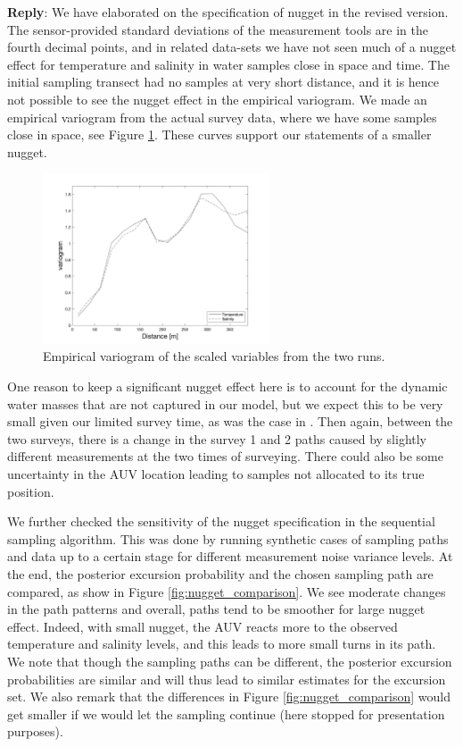 \documentclass[a4paper]{article}
\def\reply{\textbf{Reply}}
\begin{document}
\vspace{5mm}
\reply: We have elaborated on the specification of nugget in the revised version. The sensor-provided standard deviations of the measurement tools are in the fourth decimal points, and in related data-sets we have not seen much of a nugget effect for temperature and salinity in water samples close in space and time. The initial sampling transect had no samples at very short distance, and it is hence not possible to see the nugget effect in the empirical variogram. We made an empirical variogram from the actual survey data, where we have some samples close in space, see Figure \ref{empVar}. These curves support our statements of a smaller nugget.
\begin{figure}[H] 
\centering
\includegraphics[width=0.6\textwidth]{Figures/field-trials/empVAR.png}
\caption{Empirical variogram of the scaled variables from the two runs. }
\label{empVar}
\end{figure}

One reason to keep a significant nugget effect here is to account for the dynamic water masses that are not captured in our model, but we expect this to be very small given our limited survey time, as was the case in \cite{fossuminformation}. Then again, between the two surveys, there is a change in the survey 1 and 2 paths caused by slightly different measurements at the two times of surveying. There could also be some uncertainty in the AUV location leading to samples not allocated to its true position. 

We further checked the sensitivity of the nugget specification in the sequential sampling algorithm. This was done by running synthetic cases of sampling paths and data up to a certain stage for different measurement noise variance levels. At the end, the posterior excursion probability and the chosen sampling path are compared, as show in Figure \ref{fig:nugget_comparison}. We see moderate changes in the path patterns 
and overall, paths tend to be smoother for large nugget effect.
Indeed, with small nugget, the AUV reacts more to the observed temperature and salinity levels, and this leads to more small turns in its path. 
We note that though the sampling paths can be different, the posterior excursion probabilities are similar and will thus lead to similar estimates for the excursion set. We also remark that the differences in Figure \ref{fig:nugget_comparison} would get smaller if we would let the sampling continue (here stopped for presentation purposes).
\end{document}
